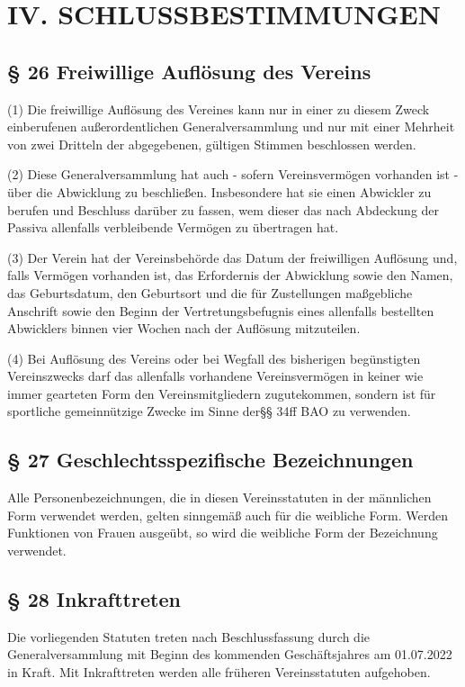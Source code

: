 \documentclass[11pt,a4paper]{article}
\begin{document}
\section{IV. SCHLUSSBESTIMMUNGEN}

\subsection{§ 26
Freiwillige Auflösung des Vereins}

(1)
Die freiwillige Auflösung des Vereines kann nur in einer zu diesem Zweck einberufenen außerordentlichen Generalversammlung und nur mit einer Mehrheit von zwei Dritteln der abgegebenen, gültigen Stimmen beschlossen werden.

(2)
Diese Generalversammlung hat auch - sofern Vereinsvermögen vorhanden ist - über die Abwicklung zu beschließen.
Insbesondere hat sie einen Abwickler zu berufen und Beschluss darüber zu fassen, wem dieser das nach Abdeckung der Passiva allenfalls verbleibende Vermögen zu übertragen hat.

(3)
Der Verein hat der Vereinsbehörde das Datum der freiwilligen Auflösung und, falls Vermögen vorhanden ist, das Erfordernis der Abwicklung sowie den Namen, das Geburtsdatum, den Geburtsort und die für Zustellungen maßgebliche Anschrift sowie den Beginn der Vertretungsbefugnis eines allenfalls bestellten Abwicklers binnen vier Wochen nach der Auflösung mitzuteilen.

(4)
Bei Auflösung des Vereins oder bei Wegfall des bisherigen begünstigten Vereinszwecks darf das allenfalls vorhandene Vereinsvermögen in keiner wie immer gearteten Form den Vereinsmitgliedern zugutekommen, sondern ist für sportliche gemeinnützige Zwecke im Sinne der§§ 34ff BAO zu verwenden.

\subsection{§ 27
Geschlechtsspezifische Bezeichnungen}

Alle Personenbezeichnungen, die in diesen Vereinsstatuten in der männlichen Form verwendet werden, gelten sinngemäß auch für die weibliche Form.
Werden Funktionen von Frauen ausgeübt, so wird die weibliche Form der Bezeichnung verwendet.

\subsection{§ 28
Inkrafttreten}

Die vorliegenden Statuten treten nach Beschlussfassung durch die Generalversammlung mit Beginn des kommenden Geschäftsjahres am 01.07.2022 in Kraft.
Mit Inkrafttreten werden alle früheren Vereinsstatuten aufgehoben.
\end{document}
